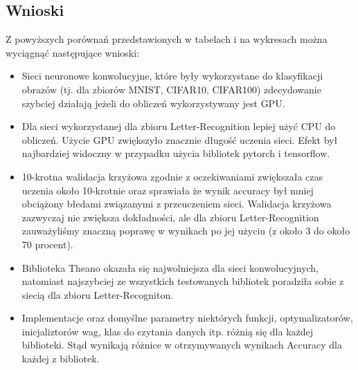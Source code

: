 \documentclass[a4paper,11pt]{article}
\begin{document}
\newpage
\paragraph{}
\subsection{Wnioski}
Z powyższych porównań przedstawionych w tabelach i na wykresach można wyciągnąć następujące wnioski:
\begin{itemize}
	\item Sieci neuronowe konwolucyjne, które były wykorzystane do klasyfikacji obrazów (tj. dla zbiorów MNIST, CIFAR10, CIFAR100) zdecydowanie szybciej działają jeżeli do obliczeń wykorzystywany jest GPU.
	\item Dla sieci wykorzystanej dla zbioru Letter-Recognition lepiej użyć CPU do obliczeń. Użycie GPU zwiększyło znacznie długość uczenia sieci. Efekt był najbardziej widoczny w przypadku użycia bibliotek pytorch i tensorflow.
	\item 10-krotna walidacja krzyżowa zgodnie z oczekiwaniami zwiększała czas uczenia około 10-krotnie oraz sprawiała że wynik accuracy był mniej obciążony błedami związanymi z przeuczeniem sieci. Walidacja krzyżowa zazwyczaj nie zwiększa dokładności, ale dla zbioru Letter-Recognition zauważyliśmy znaczną poprawę w wynikach po jej użyciu (z około 3 do około 70 procent).
	\item Biblioteka Theano okazała się najwolniejsza dla sieci konwolucyjnych, natomiast najszybciej ze wszystkich testowanych bibliotek poradziła sobie z siecią dla zbioru Letter-Recogniton.
	\item Implementacje oraz domyślne parametry niektórych funkcji, optymalizatorów, inicjaliztorów wag, klas do czytania danych itp. różnią się dla każdej biblioteki. Stąd wynikają różnice w otrzymywanych wynikach Accuracy dla każdej z bibliotek.
\end{itemize}
\newpage
\end{document}
